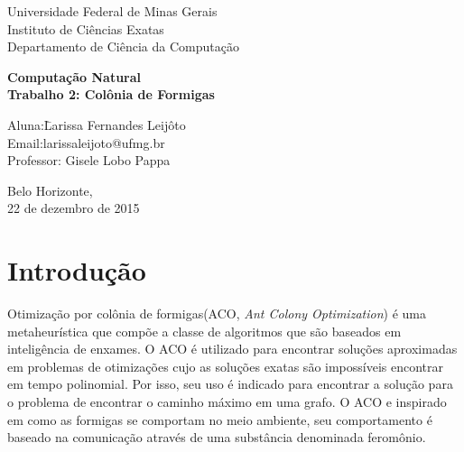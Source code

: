 \documentclass[a4paper, 12pt]{article}
\begin{document}
\onehalfspace
\begin{titlepage}
	\begin{center}
		\large{Universidade Federal de Minas Gerais\\
			Instituto de Ciências Exatas\\
			Departamento de Ciência da Computação\\
		}

\vspace{70pt}

      
        \vspace{85pt}
        
		\textbf{\huge{Computação Natural\\}}
		\large{\textbf{Trabalho 2:
        		Colônia de Formigas}}
		\vspace{160pt}
		
	\end{center}
	
	\begin{flushleft}
		\begin{tabbing}
			Aluna:\qquad\qquad\= Larissa Fernandes Leijôto\\
			Email:\qquad\qquad larissaleijoto@ufmg.br\\
			Professor:\> Gisele Lobo Pappa\\
		
	\end{tabbing}
		  
	\end{flushleft}
	
	\begin{center}
		\vspace{\fill}
		Belo Horizonte, \\22 de dezembro de 2015
	\end{center}
\end{titlepage}
\newpage
\tableofcontents
\thispagestyle{empty}

\newpage
{}

\section{Introdução}
Otimização por colônia de formigas(ACO, \textit{Ant Colony Optimization}) é uma metaheurística que compõe a classe de algoritmos que são baseados em inteligência de enxames. O ACO é utilizado para encontrar soluções aproximadas em problemas de otimizações cujo as soluções exatas são impossíveis encontrar em tempo polinomial. Por isso, seu uso é indicado para encontrar a solução para o problema de encontrar o caminho máximo em uma grafo. O ACO e inspirado em como as formigas se comportam no meio ambiente, seu comportamento é baseado na comunicação através de uma substância denominada feromônio. 
\end{document}

